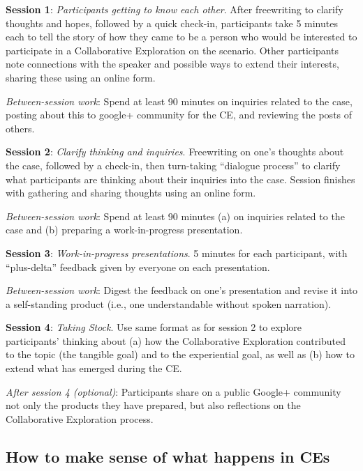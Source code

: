 \smallskip
\noindent\textbf{Session 1}: \emph{Participants getting to know each
other}. After freewriting to clarify thoughts and hopes, followed by a
quick check-in, participants take 5 minutes each to tell the story of
how they came to be a person who would be interested to participate in a
Collaborative Exploration on the scenario. Other participants note
connections with the speaker and possible ways to extend their
interests, sharing these using an online form.

\smallskip
\noindent \emph{Between-session
work}: Spend at least 90 minutes on inquiries related to the case,
posting about this to google+ community for the CE, and reviewing the
posts of others.

\smallskip
\noindent \textbf{Session 2}: \emph{Clarify thinking and
inquiries}. Freewriting on one's thoughts about the case, followed by a
check-in, then turn-taking ``dialogue process'' to clarify what
participants are thinking about their inquiries into the case. Session
finishes with gathering and sharing thoughts using an online form.

\smallskip
\noindent \emph{Between-session work}: Spend at least 90 minutes (a) on inquiries
related to the case and (b) preparing a work-in-progress presentation.

\smallskip
\noindent \textbf{Session 3}: \emph{Work-in-progress presentations}. 5 minutes for
each participant, with ``plus-delta'' feedback given by everyone on each
presentation.

\smallskip
\noindent\emph{Between-session work}: Digest the feedback on one's
presentation and revise it into a self-standing product (i.e., one
understandable without spoken narration). 

\smallskip
\noindent\textbf{Session 4}:
\emph{Taking Stock}. Use same format as for session 2 to explore
participants' thinking about (a) how the Collaborative Exploration
contributed to the topic (the tangible goal) and to the experiential
goal, as well as (b) how to extend what has emerged during the CE.

\smallskip
\noindent\emph{After session 4 (optional)}: Participants share on a public
Google+ community not only the products they have prepared, but also
reflections on the Collaborative Exploration process.

\subsection{How to make sense of what happens in CEs}

